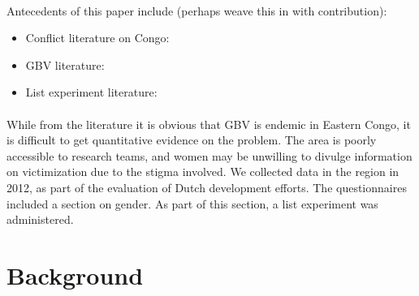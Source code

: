\documentclass[11pt,a4paper]{scrartcl} %
\begin{document}
\paragraph{}
Antecedents of this paper include (perhaps weave this in with contribution):
\begin{itemize}
	\item Conflict literature on Congo:
	\item GBV literature:
	\item List experiment literature: 
\end{itemize}

\paragraph{}
While from the literature it is obvious that GBV is endemic in Eastern Congo, it is difficult to get quantitative evidence on the problem. The area is poorly accessible to research teams, and women may be unwilling to divulge information on victimization due to the stigma involved. We collected data in the region in 2012, as part of the evaluation of Dutch development efforts. The questionnaires included a section on gender. As part of this section, a list experiment was administered.

\paragraph{}


\section*{Background}
\end{document}
